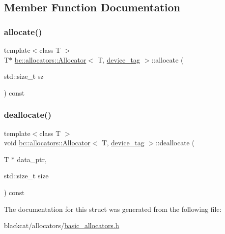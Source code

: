 \subsection{Member Function Documentation}
\mbox{\label{structbc_1_1allocators_1_1Allocator_3_01T_00_01device__tag_01_4_a140957d76e4b582ca2b85b52a8417cd0}} 
\subsubsection{\texorpdfstring{allocate()}{allocate()}}
{\footnotesize\ttfamily template$<$class T $>$ \\
T$\ast$ \hyperlink{classbc_1_1allocators_1_1Allocator}{bc\+::allocators\+::\+Allocator}$<$ T, \hyperlink{structbc_1_1device__tag}{device\+\_\+tag} $>$\+::allocate (\begin{DoxyParamCaption}\item[{std\+::size\+\_\+t}]{sz }\end{DoxyParamCaption}) const\hspace{0.3cm}{\ttfamily [inline]}}

\mbox{\label{structbc_1_1allocators_1_1Allocator_3_01T_00_01device__tag_01_4_a80060f1c76c04adb6f48e4645896ec77}} 
\subsubsection{\texorpdfstring{deallocate()}{deallocate()}}
{\footnotesize\ttfamily template$<$class T $>$ \\
void \hyperlink{classbc_1_1allocators_1_1Allocator}{bc\+::allocators\+::\+Allocator}$<$ T, \hyperlink{structbc_1_1device__tag}{device\+\_\+tag} $>$\+::deallocate (\begin{DoxyParamCaption}\item[{T $\ast$}]{data\+\_\+ptr,  }\item[{std\+::size\+\_\+t}]{size }\end{DoxyParamCaption}) const\hspace{0.3cm}{\ttfamily [inline]}}



The documentation for this struct was generated from the following file\+:\begin{DoxyCompactItemize}
\item 
blackcat/allocators/\hyperlink{basic__allocators_8h}{basic\+\_\+allocators.\+h}\end{DoxyCompactItemize}
